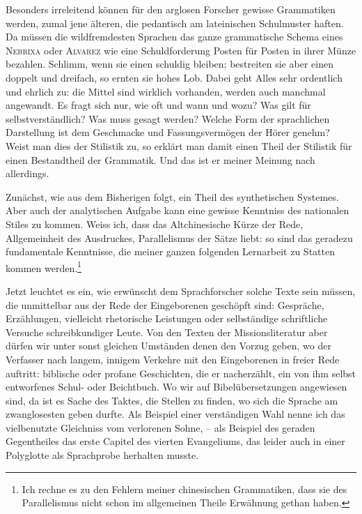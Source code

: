 \largerpage[1]Besonders irreleitend können für den arglosen Forscher gewisse Grammatiken werden, zumal jene älteren, die pedantisch am lateinischen Schulmuster haften. Da müssen die wildfremdesten Sprachen das ganze grammatische Schema eines \textsc{Nebrixa} oder \textsc{Alvarez} wie eine Schuldforderung Posten für Posten in ihrer Münze bezahlen. Schlimm, wenn sie einen schuldig bleiben; bestreiten sie aber einen doppelt und dreifach, so ernten sie hohes Lob. Dabei geht Alles sehr ordentlich und ehrlich zu: die Mittel sind wirklich vorhanden, werden auch manchmal angewandt. Es fragt sich nur, wie oft und wann und wozu? Was gilt für selbstverständlich? Was muss gesagt werden? Welche Form der sprachlichen Darstellung ist dem Geschmacke und Fassungsvermögen der Hörer genehm? Weist man dies der Stilistik zu, so erklärt man damit einen Theil der Stilistik für einen Bestand\-theil der Grammatik. Und das ist er meiner Meinung nach allerdings.

\largerpage
Zunächst, wie aus dem Bisherigen folgt, ein Theil des synthetischen Systemes. Aber auch der analytischen Aufgabe kann eine gewisse Kenntniss des nationalen Stiles zu  kommen. Weiss ich, dass das Altchinesische Kürze der Rede, Allgemeinheit des Ausdruckes, Parallelis\label{fp.111}mus der Sätze liebt: so sind das geradezu fundamentale Kenntnisse, die meiner ganzen folgenden Lernarbeit zu Statten kommen werden.\footnote{Ich rechne es zu den Fehlern meiner chinesischen Grammatiken, dass sie des Parallelismus nicht schon im allgemeinen Theile Erwähnung gethan haben.}

Jetzt leuchtet es ein, wie erwünscht dem Sprachforscher solche Texte sein müssen, die unmittelbar aus der Rede der Eingeborenen geschöpft sind: Gespräche, Erzählungen, vielleicht rhetorische Leistungen oder selbständige schriftliche Versuche schreibkundiger Leute. Von den Texten der Missionsliteratur aber dürfen wir unter sonst gleichen Umständen denen den Vorzug geben, wo der Verfasser nach langem, innigem Verkehre mit den Eingeborenen in freier Rede auftritt: biblische oder profane Geschichten, die er nacherzählt, ein von ihm selbst entworfenes Schul- oder Beichtbuch. Wo wir auf Bibelübersetzungen angewiesen sind, da ist es Sache des Taktes, die Stellen zu finden, wo sich die Sprache am zwanglosesten geben durfte. Als Beispiel einer verständigen Wahl nenne ich das vielbenutzte Gleichniss vom verlorenen Sohne, – als Beispiel des geraden Gegentheiles das erste Capitel des vierten Evangeliums, das leider auch in einer Polyglotte als Sprachprobe herhalten musste.

